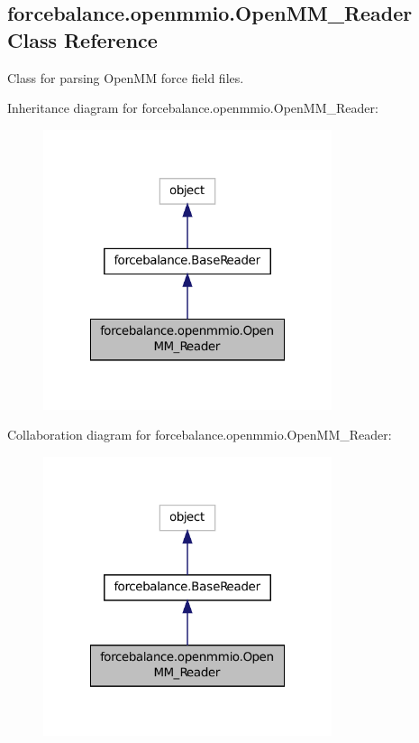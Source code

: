 \hypertarget{classforcebalance_1_1openmmio_1_1OpenMM__Reader}{\subsection{forcebalance.\-openmmio.\-Open\-M\-M\-\_\-\-Reader Class Reference}
\label{classforcebalance_1_1openmmio_1_1OpenMM__Reader}
}


Class for parsing Open\-M\-M force field files.  




Inheritance diagram for forcebalance.\-openmmio.\-Open\-M\-M\-\_\-\-Reader\-:\nopagebreak
\begin{figure}[H]
\begin{center}
\leavevmode
\includegraphics[width=240pt]{classforcebalance_1_1openmmio_1_1OpenMM__Reader__inherit__graph}
\end{center}
\end{figure}


Collaboration diagram for forcebalance.\-openmmio.\-Open\-M\-M\-\_\-\-Reader\-:\nopagebreak
\begin{figure}[H]
\begin{center}
\leavevmode
\includegraphics[width=240pt]{classforcebalance_1_1openmmio_1_1OpenMM__Reader__coll__graph}
\end{center}
\end{figure}
